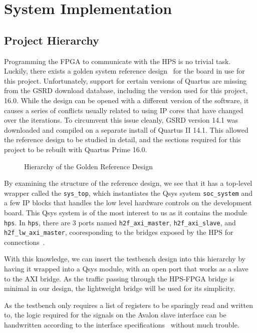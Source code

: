 \chapter{System Implementation}

\section{Project Hierarchy}
Programming the FPGA to communicate with the HPS is no trivial task.
Luckily, there exists a golden system reference design~\cite{Rocket1} for the board in use for this project.
Unfortunately, support for certain versions of Quartus are missing from the GSRD download database, including the version used for this project, 16.0.
While the design can be opened with a different version of the software, it causes a series of conflicts usually related to using IP cores that have changed over the iterations.
To circumvent this issue cleanly, GSRD version 14.1 was downloaded and compiled on a separate install of Quartus II 14.1.
This allowed the reference design to be studied in detail, and the sections required for this project to be rebuilt with Quartus Prime 16.0.

\begin{figure}[H]
  \centering
  
  \caption{Hierarchy of the Golden Reference Design}
  \label{Golden Hierarchy}
\end{figure}

By examining the structure of the reference design, we see that it has a top-level wrapper called the \texttt{sys\_top}, which instantiates the Qsys system \texttt{soc\_system} and a few IP blocks that handles the low level hardware controls on the development board.
This Qsys system is of the most interest to us as it contains the module \texttt{hps}.
In \texttt{hps}, there are 3 ports named \texttt{h2f\_axi\_master}, \texttt{h2f\_axi\_slave}, and \texttt{h2f\_lw\_axi\_master}, cooresponding to the bridges exposed by the HPS for connections~\cite{Altera6}.

With this knowledge, we can insert the testbench design into this hierarchy by having it wrapped into a Qsys module, with an open port that works as a slave to the AXI bridge.
As the traffic passing through the HPS-FPGA bridge is minimal in our design, the lightweight bridge will be used for its simplicity.

As the testbench only requires a list of registers to be sparingly read and written to, the logic required for the signals on the Avalon slave interface can be handwritten according to the interface specifications~\cite{Intel3} without much trouble.

